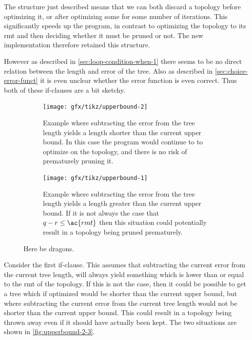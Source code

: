 The structure just described means that we can both discard a topology before
optimizing it, or after optimizing some for some number of iterations. This
significantly speeds up the program, in contrast to optimizing the topology to
its \ac{rmt} and then deciding whether it must be pruned or not. The new
implementation therefore retained this structure.

However as described in \cref{sec:loop-condition-when-1} there seems to be no
direct relation between the length and error of the tree. Also as described in
\cref{sec:choice-error-funct} it is even unclear whether the error function is
even correct. Thus both of these if-clauses are a bit sketchy.

\begin{figure}[htbp]
  \centering
  \begin{subfigure}[b]{0.4\textwidth}
    \texttt{[image: gfx/tikz/upperbound-2]}
    \caption{Example where subtracting the error from the tree
      length yields a length shorter than the current upper bound. In this case
      the program would continue to to optimize on the topology, and there is no
      risk of prematurely pruning it.\label{fig:upperbound-2}}
  \end{subfigure}\hspace{1em}
  \begin{subfigure}[b]{0.4\textwidth}
    \texttt{[image: gfx/tikz/upperbound-1]}
    \caption{Example where subtracting the error from the tree
      length yields a length greater than the current upper bound. If it is not
      always the case that $q-r \le \ac{rmt}$ then this situation could
      potentially result in a topology being pruned
      prematurely.\label{fig:upperbound-1}}
  \end{subfigure}
  \caption[Upper bounds, 1 and 2]{Here be dragons.\label{fig:upperbound-1-2}}
\end{figure}

Consider the first if-clause. This assumes that subtracting the current error
from the current tree length, will always yield something which is lower than or
equal to the \ac{rmt} of the topology. If this is not the case, then it could be
possible to get a tree which if optimized would be shorter than the current
upper bound, but where subtracting the current error from the current tree
length would not be shorter than the current upper bound. This could result in a
topology being thrown away even if it should have actually been kept. The two
situations are shown in \cref{fig:upperbound-2-3}.


